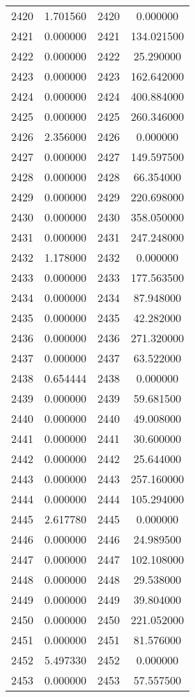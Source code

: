 \documentclass[12pt]{article}
\begin{document}
\begin{longtable}{@{}cccc@{}}
2420 & 1.701560 & 2420 & 0.000000 \\
2421 & 0.000000 & 2421 & 134.021500 \\
2422 & 0.000000 & 2422 & 25.290000 \\
2423 & 0.000000 & 2423 & 162.642000 \\
2424 & 0.000000 & 2424 & 400.884000 \\
2425 & 0.000000 & 2425 & 260.346000 \\
2426 & 2.356000 & 2426 & 0.000000 \\
2427 & 0.000000 & 2427 & 149.597500 \\
2428 & 0.000000 & 2428 & 66.354000 \\
2429 & 0.000000 & 2429 & 220.698000 \\
2430 & 0.000000 & 2430 & 358.050000 \\
2431 & 0.000000 & 2431 & 247.248000 \\
2432 & 1.178000 & 2432 & 0.000000 \\
2433 & 0.000000 & 2433 & 177.563500 \\
2434 & 0.000000 & 2434 & 87.948000 \\
2435 & 0.000000 & 2435 & 42.282000 \\
2436 & 0.000000 & 2436 & 271.320000 \\
2437 & 0.000000 & 2437 & 63.522000 \\
2438 & 0.654444 & 2438 & 0.000000 \\
2439 & 0.000000 & 2439 & 59.681500 \\
2440 & 0.000000 & 2440 & 49.008000 \\
2441 & 0.000000 & 2441 & 30.600000 \\
2442 & 0.000000 & 2442 & 25.644000 \\
2443 & 0.000000 & 2443 & 257.160000 \\
2444 & 0.000000 & 2444 & 105.294000 \\
2445 & 2.617780 & 2445 & 0.000000 \\
2446 & 0.000000 & 2446 & 24.989500 \\
2447 & 0.000000 & 2447 & 102.108000 \\
2448 & 0.000000 & 2448 & 29.538000 \\
2449 & 0.000000 & 2449 & 39.804000 \\
2450 & 0.000000 & 2450 & 221.052000 \\
2451 & 0.000000 & 2451 & 81.576000 \\
2452 & 5.497330 & 2452 & 0.000000 \\
2453 & 0.000000 & 2453 & 57.557500 \\

\end{longtable}
\end{document}
